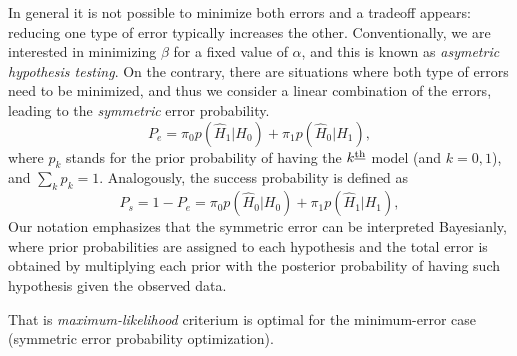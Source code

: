 In general it is not possible to minimize both errors and a tradeoff appears: reducing one type of error typically increases the other. Conventionally, we are interested in minimizing $\beta$ for a fixed value of $\alpha$, and this is known as \textit{asymetric hypothesis testing}. On the contrary, there are situations where both type of errors need to be minimized, and thus we consider a linear combination of the errors, leading to the \textit{symmetric} error probability. 
\begin{equation}\label{eq:1_statinf_symm}
P_e =  \pi_0 p(\hat{H}_1|H_0) + \pi_1 p(\hat{H}_0|H_1),
\end{equation}
where $p_k$ stands for the prior probability of having the $k^{\text{\underline{th}}}$ model (and $k=0,1$), and $\sum_k p_k=1$. Analogously, the success probability is defined as
\begin{equation}\label{eq:1_statinf_symm_ps}
P_s= 1-P_e =  \pi_0 p(\hat{H}_0|H_0) + \pi_1 p(\hat{H}_1|H_1),
\end{equation}
Our notation emphasizes that the symmetric error can be interpreted Bayesianly, where prior probabilities are assigned to each hypothesis and the total error is obtained by multiplying each prior with the posterior probability of having such hypothesis given the observed data.

That is \textit{maximum-likelihood} criterium is optimal for the minimum-error case (symmetric error probability optimization).

